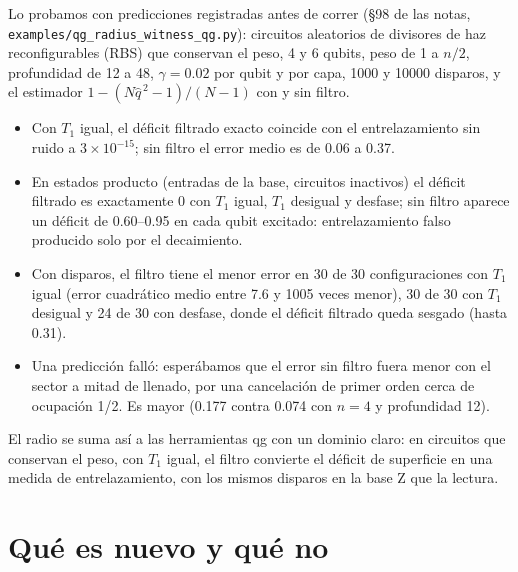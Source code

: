 \documentclass[11pt]{article}
\begin{document}
Lo probamos con predicciones registradas antes de correr (§98 de las notas,
\texttt{examples/qg\_radius\_witness\_qg.py}): circuitos aleatorios de divisores de haz reconfigurables (RBS) que
conservan el peso, 4 y 6 qubits, peso de 1 a $n/2$, profundidad de 12 a 48, $\gamma=0.02$ por qubit y por capa,
1000 y 10000 disparos, y el estimador $1-(N\hat q^{\,2}-1)/(N-1)$ con y sin filtro.
\begin{itemize}
\item Con $T_1$ igual, el déficit filtrado exacto coincide con el entrelazamiento sin ruido a $3\times10^{-15}$; sin
filtro el error medio es de 0.06 a 0.37.
\item En estados producto (entradas de la base, circuitos inactivos) el déficit filtrado es exactamente 0 con $T_1$
igual, $T_1$ desigual y desfase; sin filtro aparece un déficit de 0.60--0.95 en cada qubit excitado: entrelazamiento
falso producido solo por el decaimiento.
\item Con disparos, el filtro tiene el menor error en 30 de 30 configuraciones con $T_1$ igual (error cuadrático
medio entre 7.6 y 1005 veces menor), 30 de 30 con $T_1$ desigual y 24 de 30 con desfase, donde el déficit filtrado
queda sesgado (hasta 0.31).
\item Una predicción falló: esperábamos que el error sin filtro fuera menor con el sector a mitad de llenado, por una
cancelación de primer orden cerca de ocupación 1/2. Es mayor (0.177 contra 0.074 con $n=4$ y profundidad 12).
\end{itemize}
El radio se suma así a las herramientas qg con un dominio claro: en circuitos que conservan el peso, con $T_1$
igual, el filtro convierte el déficit de superficie en una medida de entrelazamiento, con los mismos disparos en la
base Z que la lectura.

\section{Qué es nuevo y qué no}
\end{document}
